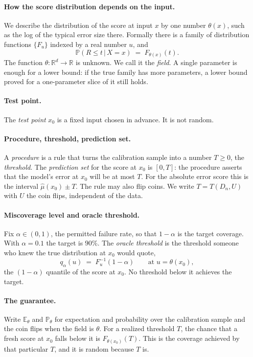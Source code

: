 \documentclass[11pt]{article}
\theoremstyle{definition}
\theoremstyle{remark}
\newcommand{\R}{\mathbb{R}}
\newcommand{\E}{\mathbb{E}}
\newcommand{\Prob}{\mathbb{P}}
\newcommand{\given}{\,|\,}
\begin{document}
\paragraph{How the score distribution depends on the input.}
We describe the distribution of the score at input $x$ by one number $\theta(x)$, such as
the log of the typical error size there. Formally there is a family of distribution
functions $\{F_u\}$ indexed by a real number $u$, and
\[
  \Prob(R\le t\given X=x)\;=\;F_{\theta(x)}(t).
\]
The function $\theta:\R^d\to\R$ is unknown. We call it the \emph{field}. A single parameter
is enough for a lower bound: if the true family has more parameters, a lower bound proved
for a one-parameter slice of it still holds.

\paragraph{Test point.}
The \emph{test point} $x_0$ is a fixed input chosen in advance. It is not random.

\paragraph{Procedure, threshold, prediction set.}
A \emph{procedure} is a rule that turns the calibration sample into a number $T\ge0$, the
\emph{threshold}. The \emph{prediction set} for the score at $x_0$ is $[0,T]$: the
procedure asserts that the model's error at $x_0$ will be at most $T$. For the absolute
error score this is the interval $\hat\mu(x_0)\pm T$. The rule may also flip coins. We write
$T=T(D_n,U)$ with $U$ the coin flips, independent of the data.

\paragraph{Miscoverage level and oracle threshold.}
Fix $\alpha\in(0,1)$, the permitted failure rate, so that $1-\alpha$ is the target
coverage. With $\alpha=0.1$ the target is $90\%$. The \emph{oracle threshold} is the
threshold someone who knew the true distribution at $x_0$ would quote,
\[
  q_\alpha(u)\;=\;F_u^{-1}(1-\alpha)\qquad\text{at }u=\theta(x_0),
\]
the $(1-\alpha)$ quantile of the score at $x_0$. No threshold below it achieves the target.

\paragraph{The guarantee.}
Write $\E_\theta$ and $\Prob_\theta$ for expectation and probability over the calibration
sample and the coin flips when the field is $\theta$. For a realized threshold $T$, the
chance that a fresh score at $x_0$ falls below it is $F_{\theta(x_0)}(T)$. This is the
coverage achieved by that particular $T$, and it is random because $T$ is.
\end{document}
